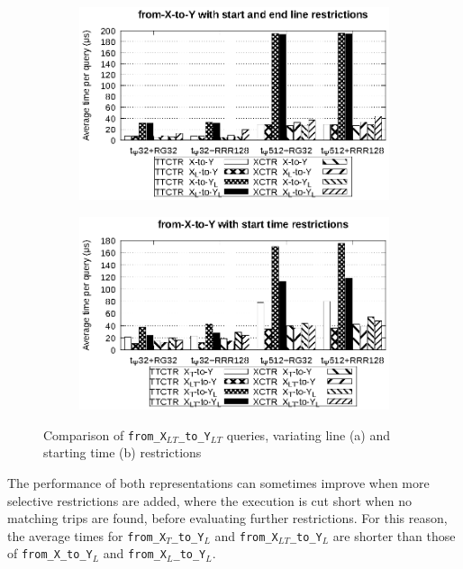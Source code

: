     \begin{figure}[ht]
    \begin{subfigure}{0.5\linewidth}
    \includegraphics[width=\linewidth]{experiments/xy0.eps}
    \vspace{-12pt}
    \caption{}
    \vspace{-12pt}
    \end{subfigure}%
    \begin{subfigure}{0.5\linewidth}
    \includegraphics[width=\linewidth]{experiments/xy1.eps}
    \vspace{-12pt}
    \caption{}
    \vspace{-12pt}
    \end{subfigure}
    \caption{Comparison of \texttt{from\_X$_{LT}$\_to\_Y$_{LT}$} queries, variating line (a) and starting time (b) restrictions}
    \label{fig:xy0}
    \end{figure}
    
    The performance of both representations can sometimes improve  when more selective restrictions are added, where the execution is cut short when no matching trips are found, before evaluating further restrictions. For this reason, the average times for \texttt{from\_X$_{T}$\_to\_Y$_{L}$} and \texttt{from\_X$_{LT}$\_to\_Y$_{L}$} are shorter than those of \texttt{from\_X\_to\_Y$_{L}$} and \texttt{from\_X$_{L}$\_to\_Y$_{L}$}.
    
